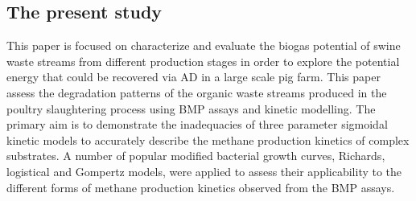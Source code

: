 \subsection{The present study}
This paper is focused on characterize and evaluate the biogas potential of swine waste streams from different production stages in order to explore the potential energy that could be recovered via AD in a large scale pig farm. This paper assess the degradation patterns of the organic waste streams produced in the poultry slaughtering process using BMP assays and kinetic modelling. The primary aim is to demonstrate the inadequacies of three parameter sigmoidal kinetic models to accurately describe the methane production kinetics of complex substrates. A number of popular modified bacterial growth curves, Richards, logistical and Gompertz models, were applied to assess their applicability to the different forms of methane production kinetics observed from the BMP assays.
